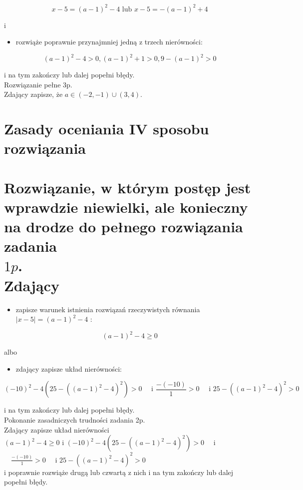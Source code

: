 \documentclass[10pt]{article}
\begin{document}
$$
x-5=(a-1)^{2}-4 \text { lub } x-5=-(a-1)^{2}+4
$$

i

\begin{itemize}
  \item rozwiąże poprawnie przynajmniej jedną z trzech nierówności:
\end{itemize}

$$
(a-1)^{2}-4>0,(a-1)^{2}+1>0,9-(a-1)^{2}>0
$$

i na tym zakończy lub dalej popełni błędy.\\
Rozwiązanie pełne 3p.\\
Zdający zapisze, że $a \in(-2,-1) \cup(3,4)$.

\section*{Zasady oceniania IV sposobu rozwiązania}
\section*{Rozwiązanie, w którym postęp jest wprawdzie niewielki, ale konieczny na drodze do pełnego rozwiązania zadania \\
 $1 p$. \\
 Zdający}
\begin{itemize}
  \item zapisze warunek istnienia rozwiązań rzeczywistych równania $|x-5|=(a-1)^{2}-4$ :
\end{itemize}

$$
(a-1)^{2}-4 \geq 0
$$

albo

\begin{itemize}
  \item zdający zapisze układ nierówności:
\end{itemize}

$$
(-10)^{2}-4\left(25-\left((a-1)^{2}-4\right)^{2}\right)>0 \quad \text { i } \frac{-(-10)}{1}>0 \quad \text { i } 25-\left((a-1)^{2}-4\right)^{2}>0
$$

i na tym zakończy lub dalej popełni błędy.\\
Pokonanie zasadniczych trudności zadania 2p.\\
Zdający zapisze układ nierówności\\
$(a-1)^{2}-4 \geq 0$ i $(-10)^{2}-4\left(25-\left((a-1)^{2}-4\right)^{2}\right)>0 \quad$ i $\quad \frac{-(-10)}{1}>0 \quad$ i $25-\left((a-1)^{2}-4\right)^{2}>0$\\
i poprawnie rozwiąże drugą lub czwartą z nich i na tym zakończy lub dalej popełni błędy.
\end{document}
